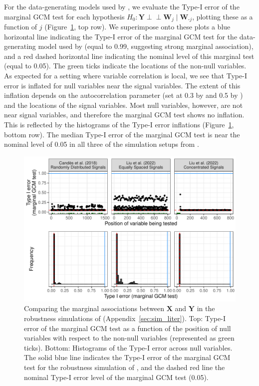 \documentclass[aos]{imsart}
\theoremstyle{plain}
\theoremstyle{remark}
\newcommand{\independent}{{\perp \! \! \! \perp}}		%
\newcommand{\prx}{\bm X}								%
\newcommand{\pry}{{\bm Y}}								%
\begin{document}
For the data-generating models used by \citet{CetL16, Liu2022a}, we evaluate the Type-I error of the marginal GCM test for each hypothesis $H_0: \pry \independent \bm W_j \mid \bm W_{\text{-}j}$, plotting these as a function of $j$ (Figure~\ref{fig:evaluation_typeI_err}, top row). We superimpose onto these plots a blue horizontal line indicating the Type-I error of the marginal GCM test for the data-generating model used by \citet{Li2022} (equal to 0.99, suggesting strong marginal association), and a red dashed horizontal line indicating the nominal level of this marginal test (equal to 0.05). The green ticks indicate the locations of the non-null variables. As expected for a setting where variable correlation is local, we see that Type-I error is inflated for null variables near the signal variables. The extent of this inflation depends on the autocorrelation parameter (set at 0.3 by \cite{CetL16} and 0.5 by \cite{Liu2022a}) and the locations of the signal variables. Most null variables, however, are not near signal variables, and therefore the marginal GCM test shows no inflation. This is reflected by the histograms of the Type-I error inflations (Figure~\ref{fig:evaluation_typeI_err}, bottom row). The median Type-I error of the marginal GCM test is near the nominal level of 0.05 in all three of the simulation setups from \citet{CetL16, Liu2022a}.

\begin{figure}[!ht]
    \centering
    \includegraphics[width = \textwidth]{figures/type_I_Err_inflation_comparison.pdf}
    \caption{Comparing the marginal associations between $\prx$ and $\pry$ in the robustness simulations of \citet{CetL16, Liu2022a, Li2022} (Appendix~\ref{sec:sim_liter}). Top: Type-I error of the marginal GCM test as a function of the position of null variables with respect to the non-null variables (represented as green ticks). Bottom: Histograms of the Type-I error across null variables. The solid blue line indicates the Type-I error of the marginal GCM test for the robustness simulation of \citet{Li2022}, and the dashed red line the nominal Type-I error level of the marginal GCM test (0.05).}
    \label{fig:evaluation_typeI_err}
\end{figure}
\end{document}
